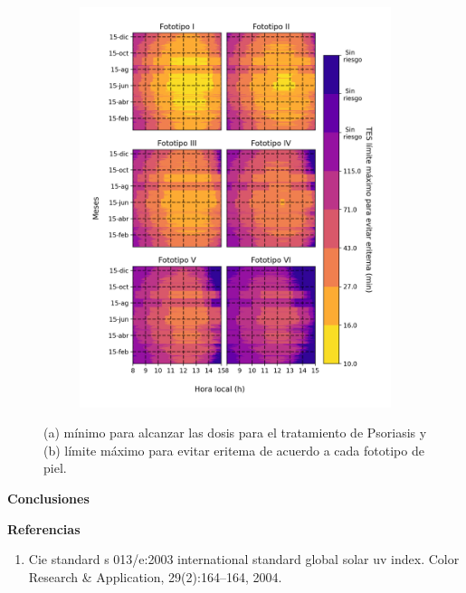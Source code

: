 \documentclass{article}
\begin{document}
\begin{multicols}{2}
\begin{figure}[H]
\begin{subfigure}[H]{0.4\linewidth}
        \includegraphics[scale=0.395]{images/ery.png}
    \end{subfigure}
\caption{(a) mínimo para alcanzar las dosis para el tratamiento de Psoriasis y 
(b) límite máximo para evitar eritema de acuerdo a cada fototipo de piel.}
\end{figure}
\changefontsizes{12pt}
\begin{center}
\begin{shaded}
\changefontsizes{12pt}
\textbf{\textcolor{na}{Conclusiones}}
\end{shaded}
\end{center}
\begin{center}
\begin{shaded}
\textbf{\textcolor{na}{Referencias}}
\end{shaded}
\changefontsizes{7pt}
% 
% 
\begin{enumerate}
\item Cie standard s 013/e:2003 international standard global solar uv index. Color Research \& Application, 29(2):164–164, 2004.

\end{enumerate}
\end{center}
\end{multicols}
\end{document}
